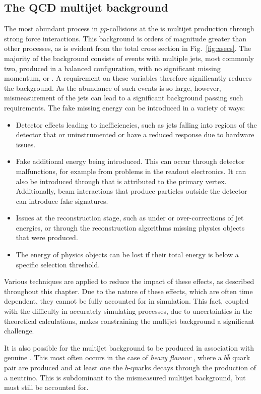\subsection{The QCD multijet background}
\label{sec:qcdMultijet}

The most abundant \SM process in $pp$-collisions at the \LHC is \QCD
multijet production through strong force interactions. This background
is orders of magnitude greater than other processes, as is evident
from the total \LHC cross section in Fig.~\ref{fig:xsecs}. The
majority of the \QCD background consists of events with multiple jets,
most commonly two, produced in a balanced configuration, with no
significant missing momentum, \MET or \MHT. A requirement on these
variables therefore significantly reduces the background. As
the abundance of such events is so large, however, mismeasurement of
the jets can lead to a significant \QCD background passing such
requirements. The fake missing energy can be introduced in a variety
of ways:
\begin{itemize}
\item{Detector effects leading to inefficiencies, such as jets
falling into regions of the detector that or uninstrumented or have a
reduced response due to hardware issues.}
\item{Fake additional energy being introduced. This can occur through
detector malfunctions, for example from problems in the readout
electronics. It can also be introduced through \PU that is attributed to
the primary vertex. Additionally, beam interactions that produce
particles outside the detector can introduce fake \MET signatures.}
\item{Issues at the reconstruction stage,
such as under or over-corrections of jet energies, or through
the reconstruction algorithms missing physics objects that were
produced.}
\item{The energy of physics objects can be lost if their total energy
is below a specific selection threshold. }
\end{itemize}

Various techniques are applied to reduce the impact of these
effects, as described throughout this chapter. Due to the nature of
these effects, which are often time dependent, they cannot be fully
accounted for in simulation. This fact, coupled with the difficulty in
accurately simulating \QCD processes, due to uncertainties in the
theoretical calculations, makes constraining the multijet background a
significant challenge. 

It is also possible for the \QCD multijet background to be produced in
association with genuine \MET. This most often occurs in the case of
\emph{heavy flavour} \QCD, where a $b\bar{b}$ quark pair are produced
and at least one the $b$-quarks decays through the production of a
neutrino.  This is subdominant to the mismeasured multijet background,
but must still be accounted for. 

